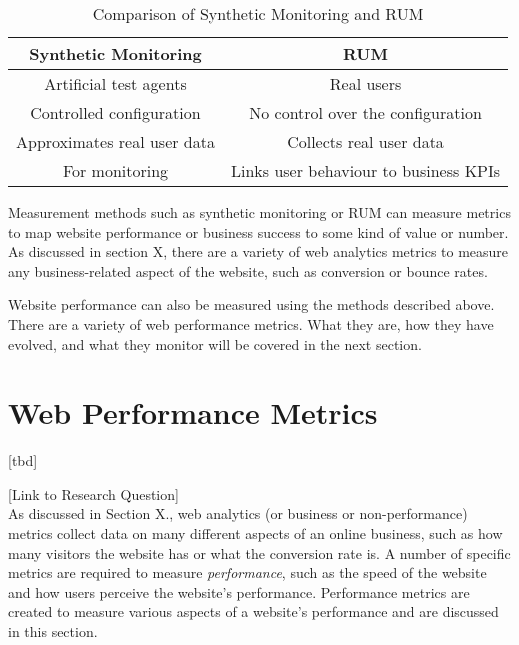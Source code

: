 \begin{table}[h]
	\small
	\centering
	\begin{tabular}{ | c | c | }
	\hline
	Synthetic Monitoring \cellcolor{lightgrey} & RUM \cellcolor{lightgrey} \\
	\hline
	Artificial test agents & Real users \\
	\hline
	Controlled configuration & No control over the configuration \\
	\hline
	Approximates real user data & Collects real user data \\
	\hline
	For monitoring & Links user behaviour to business KPIs \\
	\hline
	\end{tabular}
	\medskip
	\caption{Comparison of Synthetic Monitoring and RUM}
	\label{table:synthetic_monitoring_rum_comparison}
\end{table}


Measurement methods such as synthetic monitoring or RUM can measure metrics to map website performance or business success to some kind of value or number.
As discussed in section X, there are a variety of web analytics metrics to measure any business-related aspect of the website, such as conversion or bounce rates.

Website performance can also be measured using the methods described above.
There are a variety of web performance metrics.
What they are, how they have evolved, and what they monitor will be covered in the next section.



\section{Web Performance Metrics} %
\label{section:web_performance_metrics}

[tbd]

[Link to Research Question] \\




As discussed in Section X., web analytics (or business or non-performance) metrics collect data on many different aspects of an online business, such as how many visitors the website has or what the conversion rate is.
A number of specific metrics are required to measure \textit{performance}, such as the speed of the website and how users perceive the website's performance.
Performance metrics are created to measure various aspects of a website's performance and are discussed in this section.


